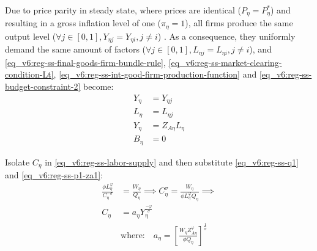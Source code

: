 \documentclass[../thesis.tex]{subfiles}
\begin{document}
Due to price parity in steady state, where prices are identical ($P_{\eta} = P_{\eta}^{\ast}$) and resulting in a gross inflation level of one ($\pi_{\eta} = 1$), all firms produce the same output level ($\forall j \in [0,1], Y_{\eta j} = Y_{\eta i}, j \neq i$) \cite[Lecture 13, p.12]{solis-garcia_ucb_2022}. As a consequence, they uniformly demand the same amount of factors ($\forall j \in [0,1], L_{\eta j} = L_{\eta i}, j \neq i$), and \ref{eq_v6:reg-ss-final-goods-firm-bundle-rule}, \ref{eq_v6:reg-ss-market-clearing-condition-Lt}, \ref{eq_v6:reg-ss-int-good-firm-production-function} and \ref{eq_v6:reg-ss-budget-constraint-2} become:
\begin{align}
	Y_{\eta} &= Y_{\eta j} \label{eq_v6:reg-ss-final-goods-firm-bundle-rule-2} \\
	L_{\eta} &= L_{\eta j} \label{eq_v6:reg-ss-market-clearing-condition-Lt-2} \\
	Y_{\eta} &= Z_{A\eta} L_{\eta} \label{eq_v6:reg-ss-int-good-firm-production-function-2} \\
	B_{\eta} &= 0 \label{eq_v6:reg-ss-budget-constraint-3}
\end{align}

\begin{comment}
	
	Substitute \ref{eq_v6:reg-ss-int-good-firm-FOC-Kt-2} in \ref{eq_v6:reg-ss-law-of-motion-for-capital}:
	\begin{align}
		I_{\eta} &= \delta K_{\eta} \implies I_{\eta} = \delta {\alpha_{\eta}} \frac{\Lambda_{}}{R_K} Y_{\eta} \implies \tag{\ref{eq_v6:reg-ss-law-of-motion-for-capital}} \\
		I_{\eta} &= b_{\eta} Y_{\eta} \label{eq_v6:reg-ss-investment} \\
		& \text{where:} \quad b_{\eta} = \delta {\alpha_{\eta}} \frac{\Lambda_{}}{R_K} \label{eq_v6:reg-ss-b-eta}
	\end{align}

\end{comment}
	
	Isolate $C_{\eta}$ in \ref{eq_v6:reg-ss-labor-supply} and then substitute \ref{eq_v6:reg-ss-q1} and \ref{eq_v6:reg-ss-p1-za1}:
	\begin{align}
		\frac{\phi L_{\eta}^{\varphi}}{C_{\eta}^{-\sigma}} &= \frac{W_{\eta}}{Q_{\eta}} \implies C_{\eta}^{\sigma} = \frac{W_{\eta}}{\phi L_{\eta}^{\varphi} Q_{\eta}} \implies \nonumber\\
		C_{\eta} &= a_{\eta} Y_{\eta}^{\frac{-\varphi}{\sigma}} \label{eq_v6:reg-ss-consumption} \\
		& \text{where:} \quad a_{\eta} = \left[ \frac{W_{\eta} Z_{A\eta}^{\varphi}}{\phi  Q_{\eta}} \right]^{\frac{1}{\sigma}} \label{eq_v6:reg-ss-a-eta}
	\end{align}
\end{document}
